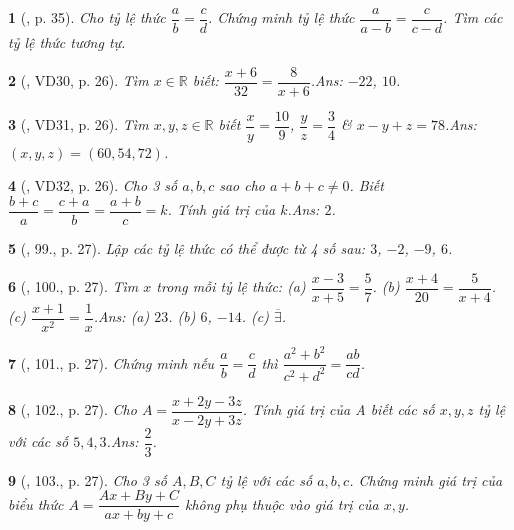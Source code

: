 \documentclass{article}
\newtheorem{baitoan}{}
\begin{document}
\begin{baitoan}[\cite{Binh_boi_duong_Toan_7_tap_1}, p. 35]
	Cho tỷ lệ thức $\dfrac{a}{b} = \dfrac{c}{d}$. Chứng minh tỷ lệ thức $\dfrac{a}{a - b} = \dfrac{c}{c - d}$. Tìm các tỷ lệ thức tương tự.
\end{baitoan}

\begin{baitoan}[\cite{Tuyen_Toan_7}, VD30, p. 26]
	Tìm $x\in\mathbb{R}$ biết: $\dfrac{x + 6}{32} = \dfrac{8}{x + 6}$.\hfill{\sf Ans:} $-22$, $10$.
\end{baitoan}

\begin{baitoan}[\cite{Tuyen_Toan_7}, VD31, p. 26]
	Tìm $x,y,z\in\mathbb{R}$ biết $\dfrac{x}{y} = \dfrac{10}{9}$, $\dfrac{y}{z} = \dfrac{3}{4}$ \& $x - y + z = 78$.\hfill{\sf Ans:} $(x,y,z) = (60,54,72)$.
\end{baitoan}

\begin{baitoan}[\cite{Tuyen_Toan_7}, VD32, p. 26]
	Cho 3 số $a,b,c$ sao cho $a + b + c\ne 0$. Biết $\dfrac{b + c}{a} = \dfrac{c + a}{b} = \dfrac{a + b}{c} = k$. Tính giá trị của $k$.\hfill{\sf Ans:} $2$.
\end{baitoan}

\begin{baitoan}[\cite{Tuyen_Toan_7}, 99., p. 27]
	Lập các tỷ lệ thức có thể được từ 4 số sau: $3$, $-2$, $-9$, $6$.
\end{baitoan}

\begin{baitoan}[\cite{Tuyen_Toan_7}, 100., p. 27]
	Tìm $x$ trong mỗi tỷ lệ thức: (a) $\dfrac{x - 3}{x + 5} = \dfrac{5}{7}$. (b) $\dfrac{x + 4}{20} = \dfrac{5}{x + 4}$. (c) $\dfrac{x + 1}{x^2} = \dfrac{1}{x}$.\hfill{\sf Ans:} (a) $23$. (b) $6$, $-14$. (c) $\overline{\exists}$.
\end{baitoan}

\begin{baitoan}[\cite{Tuyen_Toan_7}, 101., p. 27]
	Chứng minh nếu $\dfrac{a}{b} = \dfrac{c}{d}$ thì $\dfrac{a^2 + b^2}{c^2 + d^2} = \dfrac{ab}{cd}$.
\end{baitoan}

\begin{baitoan}[\cite{Tuyen_Toan_7}, 102., p. 27]
	Cho $A = \dfrac{x + 2y - 3z}{x - 2y + 3z}$. Tính giá trị của A biết các số $x,y,z$ tỷ lệ với các số $5,4,3$.\hfill{\sf Ans:} $\dfrac{2}{3}$.
\end{baitoan}

\begin{baitoan}[\cite{Tuyen_Toan_7}, 103., p. 27]
	Cho 3 số $A,B,C$ tỷ lệ với các số $a,b,c$. Chứng minh giá trị của biểu thức $A = \dfrac{Ax + By + C}{ax + by + c}$ không phụ thuộc vào giá trị của $x,y$.
\end{baitoan}
\end{document}
